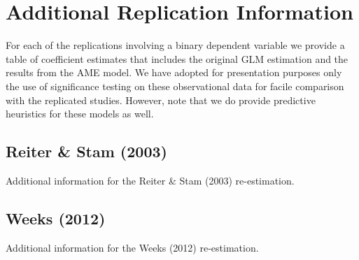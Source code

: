\section{Additional Replication Information}

For each of the replications involving a binary dependent variable we provide a table of coefficient estimates that includes the original GLM estimation and the results from the AME model.  We have adopted for presentation purposes only the use of significance testing on these observational data for facile comparison with the replicated studies.  However, note that we do provide predictive heuristics for these models as well.


\clearpage
\subsection*{Reiter \& Stam (2003)}

Additional information for the Reiter \& Stam (2003) re-estimation.


\FloatBarrier

\FloatBarrier
\clearpage

\subsection*{Weeks (2012)}

Additional information for the Weeks (2012) re-estimation.


\FloatBarrier

\FloatBarrier
\clearpage

